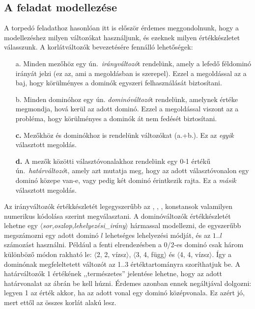 \subsection{A feladat modellezése}

A torpedó feladathoz hasonlóan itt is először érdemes meggondolnunk, hogy a modellezéshez
milyen változókat használjunk, és ezeknek milyen értékkészletet válasszunk. A korlátváltozók
bevezetésére fennálló lehetőségek:

\begin{itemize}
\item[a.] Minden mezőhöz egy ún.\ \emph{irányváltozó}t rendelünk, amely a
    lefedő féldominó irányát jelzi (ez az, ami a megoldásban is szerepel).
    Ezzel a megoldással az a baj, hogy körülményes a dominók egyszeri
    felhasználását biztosítani.
\item[b.] Minden dominóhoz egy ún. \emph{dominóváltozó}t rendelünk,
    amelynek értéke megmondja, hová kerül az adott dominó. Ezzel a megoldással
    viszont az a probléma, hogy körülményes a dominók át nem fedését biztosítani. 
\item[{\bf c.}] Mezőkhöz és dominókhoz is rendelünk változókat (a.+b.). Ez az
    \emph{egyik} választott megoldás.
\item[{\bf d.}] A mezők közötti választóvonalakhoz rendelünk egy 0-1 értékű ún.\
\emph{határváltozó}t, amely azt mutatja meg, hogy az adott választóvonalon egy
dominó közepe van-e, vagy pedig két dominó érintkezik rajta. Ez a \emph{másik}
    választott megoldás.
\end{itemize}

Az irányváltozók értékkészletét legegyszerűbb az , , , 
konstansok valamilyen numerikus kódolása szerint megválasztani. A dominóváltozók
értékkészletét lehetne egy $\langle${\em sor,oszlop,lehelyezési\_irány}$\rangle$
hármassal modellezni, de egyszerűbb megszámozni egy adott dominó $l$ lehetséges
lehelyezési módját, és az $1..l$ számozást használni. Például a fenti elrendezésben
a 0/2-es dominó csak három különböző módon rakható le: $\langle$2, 2, vízsz$\rangle$,
$\langle$3, 4, függ$\rangle$ és $\langle$4, 4, vízsz$\rangle$. Így a dominónak
megfeleltetett változót az 1..3 értéktartományra szoríthatjuk be. A határváltozók
1 értékének ,,természetes'' jelentése lehetne, hogy az adott határvonalat az ábrán
be kell húzni. Érdemes azonban ennek negáltjával dolgozni: legyen 1 az érték akkor,
ha az adott vonal egy dominó középvonala. Ez azért jó, mert ettől az összes korlát
\cd{A+B+... \#= 1} alakú lesz.

